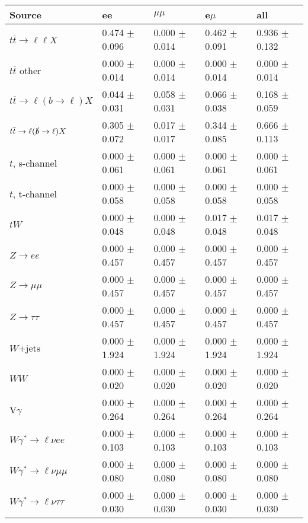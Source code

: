 \begin{tabular}{l | l l l l}
\hline\hline
 Source  &  ee  &  $\mu\mu$  &  e$\mu$  &  all \\
\hline
$t\overline{t}\rightarrow \ell\ell X$ &  0.474 $\pm$  0.096 &  0.000 $\pm$  0.014 &  0.462 $\pm$  0.091 &  0.936 $\pm$  0.132\\
$t\overline{t}$ other &  0.000 $\pm$  0.014 &  0.000 $\pm$  0.014 &  0.000 $\pm$  0.014 &  0.000 $\pm$  0.014\\
$t\overline{t}\rightarrow \ell(b\rightarrow \ell)X$ &  0.044 $\pm$  0.031 &  0.058 $\pm$  0.031 &  0.066 $\pm$  0.038 &  0.168 $\pm$  0.059\\
$t\overline{t}\rightarrow \ell(\slashed{b}\rightarrow \ell)X$ &  0.305 $\pm$  0.072 &  0.017 $\pm$  0.017 &  0.344 $\pm$  0.085 &  0.666 $\pm$  0.113\\
\hline
$t$, s-channel &  0.000 $\pm$  0.061 &  0.000 $\pm$  0.061 &  0.000 $\pm$  0.061 &  0.000 $\pm$  0.061\\
$t$, t-channel &  0.000 $\pm$  0.058 &  0.000 $\pm$  0.058 &  0.000 $\pm$  0.058 &  0.000 $\pm$  0.058\\
$tW$ &  0.000 $\pm$  0.048 &  0.000 $\pm$  0.048 &  0.017 $\pm$  0.048 &  0.017 $\pm$  0.048\\
\hline
$Z\rightarrow ee$ &  0.000 $\pm$  0.457 &  0.000 $\pm$  0.457 &  0.000 $\pm$  0.457 &  0.000 $\pm$  0.457\\
$Z\rightarrow\mu\mu$ &  0.000 $\pm$  0.457 &  0.000 $\pm$  0.457 &  0.000 $\pm$  0.457 &  0.000 $\pm$  0.457\\
$Z\rightarrow\tau\tau$ &  0.000 $\pm$  0.457 &  0.000 $\pm$  0.457 &  0.000 $\pm$  0.457 &  0.000 $\pm$  0.457\\
$W$+jets &  0.000 $\pm$  1.924 &  0.000 $\pm$  1.924 &  0.000 $\pm$  1.924 &  0.000 $\pm$  1.924\\
$WW$ &  0.000 $\pm$  0.020 &  0.000 $\pm$  0.020 &  0.000 $\pm$  0.020 &  0.000 $\pm$  0.020\\
\hline
V$\gamma$ &  0.000 $\pm$  0.264 &  0.000 $\pm$  0.264 &  0.000 $\pm$  0.264 &  0.000 $\pm$  0.264\\
$W\gamma^{*}\rightarrow\ell\nu e e$ &  0.000 $\pm$  0.103 &  0.000 $\pm$  0.103 &  0.000 $\pm$  0.103 &  0.000 $\pm$  0.103\\
$W\gamma^{*}\rightarrow\ell\nu\mu\mu$ &  0.000 $\pm$  0.080 &  0.000 $\pm$  0.080 &  0.000 $\pm$  0.080 &  0.000 $\pm$  0.080\\
$W\gamma^{*}\rightarrow\ell\nu\tau\tau$ &  0.000 $\pm$  0.030 &  0.000 $\pm$  0.030 &  0.000 $\pm$  0.030 &  0.000 $\pm$  0.030\\

\end{tabular}
